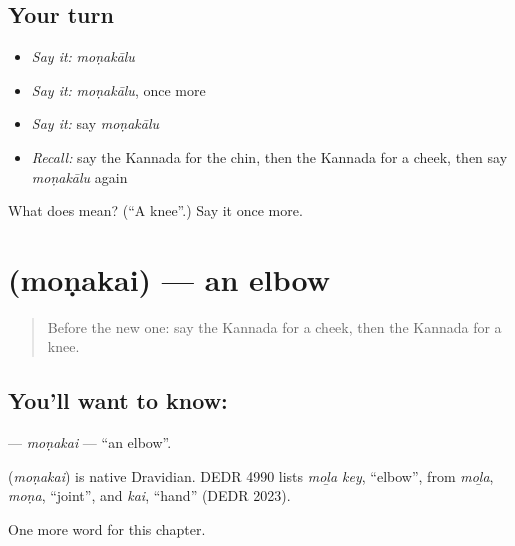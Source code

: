 \subsection*{Your turn}
\begin{itemize}
\raggedright
  \item \emph{Say it:} \emph{moṇakālu}
  \item \emph{Say it:} \emph{moṇakālu}, once more
  \item \emph{Say it:} say \emph{moṇakālu}
  \item \emph{Recall:} say the Kannada for the chin, then the Kannada for a cheek, then say \emph{moṇakālu} again
\end{itemize}

\begin{tcolorbox}[breakable,colback=teal!4,colframe=teal!35!black,title={Before you move on}]
What does  mean? (\textquotedblleft{}A knee\textquotedblright{}.) Say it once more.
\end{tcolorbox}
\section[\texorpdfstring{\kn{ಮೊಣಕೈ} (moṇakai)}{ಮೊಣಕೈ (moṇakai)}]{ (moṇakai) — an elbow}

\label{lesson:KA-C135-monakai}



\begin{quote}
Before the new one: say the Kannada for a cheek, then the Kannada for a knee.
\end{quote}

\subsection*{You'll want to know: }
\textbf{} — \emph{moṇakai} — \textquotedblleft{}an elbow\textquotedblright{}.

\begin{cousinweb}
\textbf{} (\emph{moṇakai}) is native Dravidian. DEDR 4990 lists \emph{moḻa key}, \textquotedblleft{}elbow\textquotedblright{}, from \emph{moḻa}, \emph{moṇa}, \textquotedblleft{}joint\textquotedblright{}, and \emph{kai}, \textquotedblleft{}hand\textquotedblright{} (DEDR 2023).
\end{cousinweb}

\begin{grammarlens}[title={What you've built}]
One more word for this chapter.
\end{grammarlens}

